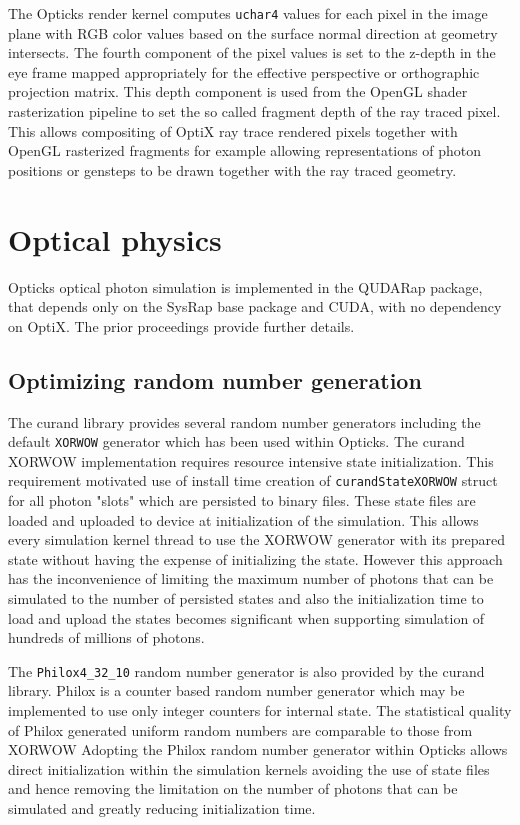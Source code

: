 \documentclass{webofc}
\begin{document}
The Opticks render kernel computes {\tt uchar4} values for each pixel in the image 
plane with RGB color values based on the surface normal direction at geometry intersects. 
The fourth component of the pixel values is set to the z-depth in the eye frame 
mapped appropriately for the effective perspective or orthographic projection matrix. 
This depth component is used from the OpenGL shader rasterization pipeline to set the 
so called fragment depth of the ray traced pixel. This allows compositing of OptiX ray 
trace rendered pixels together with OpenGL rasterized fragments for example 
allowing representations of photon positions or gensteps to be 
drawn together with the ray traced geometry. 
 

\section{Optical physics}%
%
Opticks optical photon simulation is implemented in the QUDARap package, 
that depends only on the SysRap base package and CUDA, with no dependency on OptiX. 
The prior proceedings\cite{chep2023} provide further details. 
%
\subsection{Optimizing random number generation}
%
The curand library provides several random number generators
including the default {\tt XORWOW} generator which has been used within Opticks.  
The curand XORWOW implementation requires resource intensive state initialization.
This requirement motivated use of install time creation of {\tt curandStateXORWOW} 
struct for all photon "slots" which are persisted to binary files. 
These state files are loaded and uploaded to device at initialization 
of the simulation. This allows every simulation kernel thread 
to use the XORWOW generator with its prepared state without having the expense of 
initializing the state. However this approach has the inconvenience of 
limiting the maximum number of photons that can be simulated to the number
of persisted states and also the initialization time to load and upload the 
states becomes significant when supporting simulation of hundreds of millions 
of photons. 

The {\tt Philox4\_32\_10} random number generator is also provided by the curand library. 
Philox is a counter based random number generator which may be implemented to 
use only integer counters for internal state. 
The statistical quality of Philox generated uniform random numbers are comparable to those from XORWOW\cite{curandRNGTest} 
Adopting the Philox random number generator within Opticks allows direct initialization within
the simulation kernels avoiding the use of state files and hence removing the 
limitation on the number of photons that can be simulated and greatly reducing 
initialization time. 
%
\end{document}
